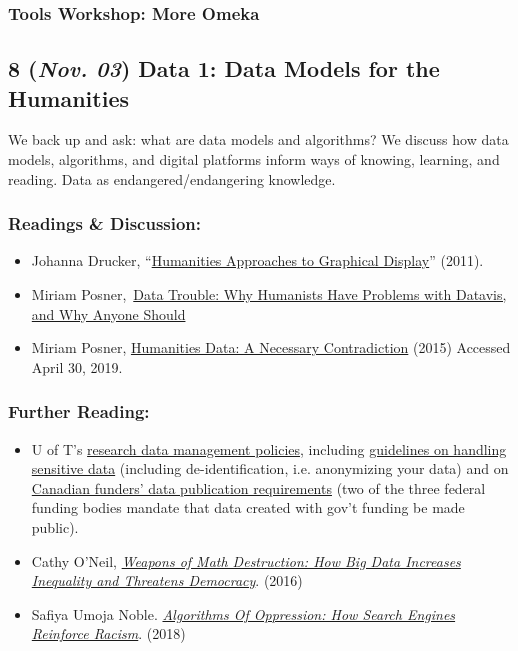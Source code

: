 \documentclass[11pt]{article}
\begin{document}
\subsubsection*{Tools Workshop: More Omeka}
\label{sec:orgf40fcc1}
\subsection*{8 (\textit{Nov. 03}) Data 1: Data Models for the Humanities}
\label{sec:org320bf26}
We back up and ask: what are data models and algorithms? We discuss how data models, algorithms, and digital platforms inform ways of knowing, learning, and reading. Data as endangered/endangering knowledge. 
\subsubsection*{Readings \& Discussion:}
\label{sec:org11a551b}
\begin{itemize}
\item Johanna Drucker, “\href{http://www.digitalhumanities.org/dhq/vol/5/1/000091/000091.html}{Humanities Approaches to Graphical Display}” (2011).
\item Miriam Posner, \href{https://www.youtube.com/watch?v=sW0u1pNQNxc}{Data Trouble: Why Humanists Have Problems with Datavis, and Why Anyone Should}
\item Miriam Posner, \href{http://miriamposner.com/blog/humanities-data-a-necessary-contradiction/}{Humanities Data: A Necessary Contradiction} (2015) Accessed April 30, 2019.
\end{itemize}
\subsubsection*{Further Reading:}
\label{sec:orgc5c8321}
\begin{itemize}
\item U of T's \href{https://onesearch.library.utoronto.ca/researchdata}{research data management policies}, including \href{https://onesearch.library.utoronto.ca/researchdata/sensitive-data}{guidelines on handling sensitive data} (including de-identification, i.e. anonymizing your data) and on \href{https://onesearch.library.utoronto.ca/researchdata/funder-requirements}{Canadian funders' data publication requirements} (two of the three federal funding bodies mandate that data created with gov't funding be made public).
\item Cathy O’Neil, \emph{\href{https://search.library.utoronto.ca/search?Ntx=mode\%2520matchallpartial\&Ntk=Anywhere\&N=0\&Ntt=\%2522weapons\%2520of\%2520math\%2520destruction\%2522\&Nr=p\_work\_normalized:ONeil\%2520Cathy\%2520Weapons\%2520of\%2520math\%2520destruction\&uuid=7c23a669-7240-41dc-94d6-592f201cb609}{Weapons of Math Destruction: How Big Data Increases Inequality and Threatens Democracy}}. (2016)
\item Safiya Umoja Noble. \emph{\href{https://ebookcentral-proquest-com.myaccess.library.utoronto.ca/lib/utoronto/detail.action?docID=4834260}{Algorithms Of Oppression: How Search Engines Reinforce Racism}}. (2018)
\end{itemize}
\end{document}
